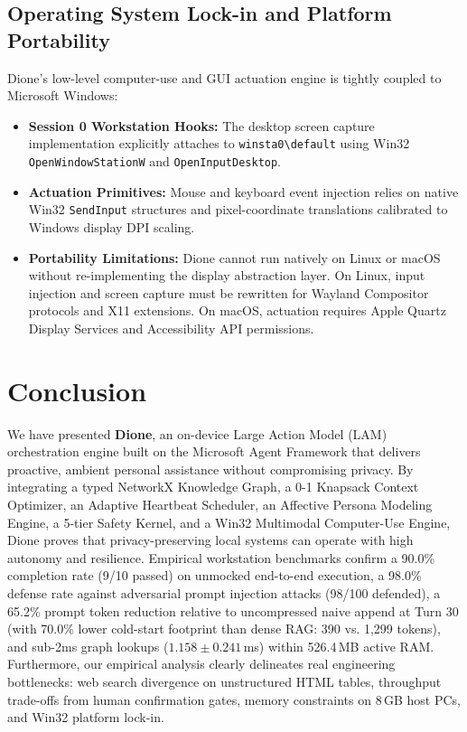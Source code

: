 \documentclass[conference,a4paper]{IEEEtran}
\begin{document}
\subsection{Operating System Lock-in and Platform Portability}
Dione's low-level computer-use and GUI actuation engine is tightly coupled to Microsoft Windows:
\begin{itemize}
    \item \textbf{Session 0 Workstation Hooks:} The desktop screen capture implementation explicitly attaches to \texttt{winsta0\textbackslash default} using Win32 \texttt{OpenWindowStationW} and \texttt{OpenInputDesktop}.
    \item \textbf{Actuation Primitives:} Mouse and keyboard event injection relies on native Win32 \texttt{SendInput} structures and pixel-coordinate translations calibrated to Windows display DPI scaling.
    \item \textbf{Portability Limitations:} Dione cannot run natively on Linux or macOS without re-implementing the display abstraction layer. On Linux, input injection and screen capture must be rewritten for Wayland Compositor protocols and X11 extensions. On macOS, actuation requires Apple Quartz Display Services and Accessibility API permissions.
\end{itemize}

\section{Conclusion}

We have presented \textbf{Dione}, an on-device Large Action Model (LAM) orchestration engine built on the Microsoft Agent Framework that delivers proactive, ambient personal assistance without compromising privacy. By integrating a typed NetworkX Knowledge Graph, a 0-1 Knapsack Context Optimizer, an Adaptive Heartbeat Scheduler, an Affective Persona Modeling Engine, a 5-tier Safety Kernel, and a Win32 Multimodal Computer-Use Engine, Dione proves that privacy-preserving local systems can operate with high autonomy and resilience. Empirical workstation benchmarks confirm a 90.0\% completion rate (9/10 passed) on unmocked end-to-end execution, a 98.0\% defense rate against adversarial prompt injection attacks (98/100 defended), a 65.2\% prompt token reduction relative to uncompressed naive append at Turn 30 (with 70.0\% lower cold-start footprint than dense RAG: 390 vs. 1,299 tokens), and sub-2ms graph lookups ($1.158 \pm 0.241$\,ms) within 526.4\,MB active RAM. Furthermore, our empirical analysis clearly delineates real engineering bottlenecks: web search divergence on unstructured HTML tables, throughput trade-offs from human confirmation gates, memory constraints on 8\,GB host PCs, and Win32 platform lock-in.
\end{document}
